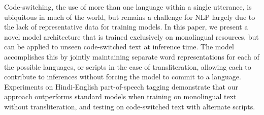 Code-switching, the use of more than one language within a single utterance, is ubiquitous in much of the world, but remains a challenge for NLP largely due to the lack of representative data for training models. In this paper, we present a novel model architecture that is trained exclusively on monolingual resources, but can be applied to unseen code-switched text at inference time.  The model accomplishes this by jointly maintaining separate word representations for each of the possible languages,  or scripts in the case of transliteration, allowing each to contribute to inferences without forcing the model to commit to a language.  Experiments on Hindi-English part-of-speech tagging demonstrate that our approach outperforms standard models when training on monolingual text without transliteration, and testing on code-switched text with alternate scripts.

